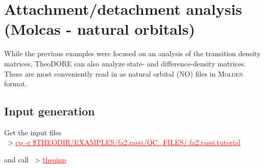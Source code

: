 \documentclass[DIV=12,headings=normal]{scrartcl}
\newcommand{\redl}[1]{{\textcolor{red}{\underline{#1}}}}
\newcommand{\comm}[1]{
\small
~> \redl{#1}
\normalsize
}
\begin{document}
\section{Attachment/detachment analysis (Molcas - natural orbitals)}
While the previous examples were focused on an analysis of the transition density matrices, TheoDORE can also analyze state- and difference-density matrices.
These are most conveniently read in as natural orbital (NO) files in \textsc{Molden} format.

\subsection{Input generation}
Get the input files \\
\comm{cp -r \$THEODIR/EXAMPLES/fa2.rassi/QC\_FILES/ fa2.rassi.tutorial}

and call \comm{theoinp}
\end{document}
